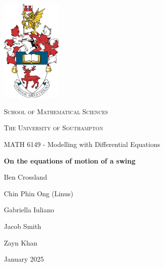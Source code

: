 \documentclass[12pt]{article}
\begin{document}


\begin{titlepage}
    \centering
    \includegraphics[width=3cm]{Figures/crest.jpg}\par
    \vspace{0.3cm}
    {\scshape\Large School of Mathematical Sciences \par}
    \vspace{0.25cm}
    {\scshape\Large The University of Southampton \par}
    \vspace{0.25cm}
    {\Large MATH 6149 - Modelling with Differential Equations \par}
    \vspace{0.5cm}
    {\huge\bfseries On the equations of motion of a swing\par}
    \vspace{0.5cm}
    {\Large Ben Crossland \par}
    \vspace{0.25cm}
    {\Large Chin Phin Ong (Linus) \par}
    \vspace{0.25cm}
    {\Large Gabriella Iuliano\par} %
    \vspace{0.25cm}
    {\Large Jacob Smith \par}
    \vspace{0.25cm}
    {\Large Zayn Khan \par}
    {\large  \par}
    \vfill
    {\large January 2025 \par}
\end{titlepage}
\end{document}
